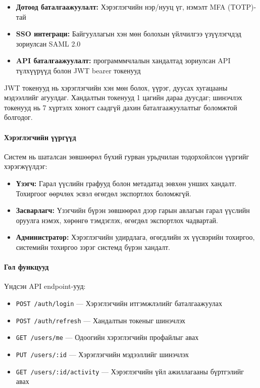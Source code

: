 \begin{itemize}
    \item \textbf{Дотоод баталгаажуулалт:} Хэрэглэгчийн нэр/нууц үг, нэмэлт MFA (TOTP)-тай
    \item \textbf{SSO интеграци:} Байгууллагын хэн мөн болохын үйлчилгээ үзүүлэгчдэд зориулсан SAML 2.0
    \item \textbf{API баталгаажуулалт:} программмчлалын хандалтад зориулсан API түлхүүрүүд болон JWT bearer токенууд
\end{itemize}

JWT токенууд нь хэрэглэгчийн хэн мөн болох, үүрэг, дуусах хугацааны мэдээллийг агуулдаг. Хандалтын токенууд 1 цагийн дараа дуусдаг; шинэчлэх токенууд нь 7 хүртэлх хоногт саадгүй дахин баталгаажуулалтыг боломжтой болгодог.

\paragraph{Хэрэглэгчийн үүргүүд}
Систем нь шаталсан зөвшөөрөл бүхий гурван урьдчилан тодорхойлсон үүргийг хэрэгжүүлдэг:

\begin{itemize}
    \item \textbf{Үзэгч:} Гарал үүслийн графууд болон метадатад зөвхөн унших хандалт. Тохиргоог өөрчлөх эсвэл өгөгдөл экспортлох боломжгүй.
    
    \item \textbf{Засварлагч:} Үзэгчийн бүрэн зөвшөөрөл дээр гарын авлагын гарал үүслийн оруулга нэмэх, хөрөнгө тэмдэглэх, өгөгдөл экспортлох чадвартай.
    
    \item \textbf{Администратор:} Хэрэглэгчийн удирдлага, өгөгдлийн эх үүсвэрийн тохиргоо, системийн тохиргоо зэрэг системд бүрэн хандалт.
\end{itemize}

\paragraph{Гол функцууд}
Үндсэн API endpoint-ууд:
\begin{itemize}
    \item \texttt{POST /auth/login} --- Хэрэглэгчийн итгэмжлэлийг баталгаажуулах
    \item \texttt{POST /auth/refresh} --- Хандалтын токеныг шинэчлэх
    \item \texttt{GET /users/me} --- Одоогийн хэрэглэгчийн профайлыг авах
    \item \texttt{PUT /users/:id} --- Хэрэглэгчийн мэдээллийг шинэчлэх
    \item \texttt{GET /users/:id/activity} --- Хэрэглэгчийн үйл ажиллагааны бүртгэлийг авах
\end{itemize}

